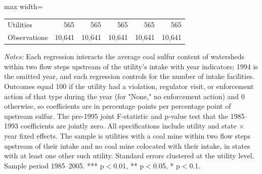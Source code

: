 \begin{table}[htbp]
{\begin{adjustbox}{max width=\linewidth}
\begin{tabular}{lrrrrr}
Utilities & 565 & 565 & 565 & 565 & 565 \\
Observations & 10,641 & 10,641 & 10,641 & 10,641 & 10,641 \\
\bottomrule
\end{tabular}
\end{adjustbox}
}
\begin{minipage}{\linewidth}
\vspace{4pt}
\footnotesize
\raggedright
\textit{Notes:} Each regression interacts the average coal sulfur content of watersheds within two flow steps upstream of the utility's intake with year indicators; 1994 is the omitted year, and each regression controls for the number of intake facilities. Outcomes equal 100 if the utility had a violation, regulator visit, or enforcement action of that type during the year (for "None," no enforcement action) and 0 otherwise, so coefficients are in percentage points per percentage point of upstream sulfur. The pre-1995 joint F-statistic and p-value test that the 1985--1993 coefficients are jointly zero. All specifications include utility and state $\times$ year fixed effects. The sample is utilities with a coal mine within two flow steps upstream of their intake and no coal mine colocated with their intake, in states with at least one other such utility. Standard errors clustered at the utility level. Sample period 1985--2005. *** p$<$0.01, ** p$<$0.05, * p$<$0.1.
\end{minipage}
\end{table}
